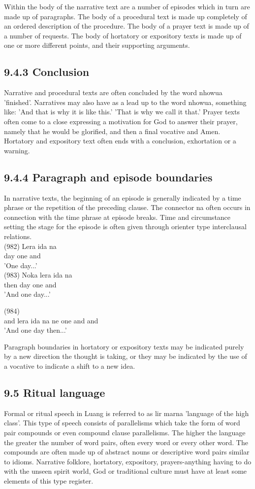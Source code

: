 \documentclass[10pt]{article}
\begin{document}
Within the body of the narrative text are a number of episodes which in turn are made up of paragraphs. The body of a procedural text is made up completely of an ordered description of the procedure. The body of a prayer text is made up of a number of requests. The body of hortatory or expository texts is made up of one or more different points, and their supporting arguments.

\subsection*{9.4.3 Conclusion}
Narrative and procedural texts are often concluded by the word nhowua 'finished'. Narratives may also have as a lead up to the word nhowua, something like: 'And that is why it is like this.' 'That is why we call it that.' Prayer texts often come to a close expressing a motivation for God to answer their prayer, namely that he would be glorified, and then a final vocative and Amen. Hortatory and expository text often ends with a conclusion, exhortation or a warning.

\subsection*{9.4.4 Paragraph and episode boundaries}
In narrative texts, the beginning of an episode is generally indicated by a time phrase or the repetition of the preceding clause. The connector na often occurs in connection with the time phrase at episode breaks. Time and circumstance setting the stage for the episode is often given through orienter type interclausal relations.\\
(982) Lera ida na\\
day one and\\
'One day...'\\
(983) Noka lera ida na\\
then day one and\\
'And one day...'

(984)\\
and lera ida na ne one and and\\
'And one day then...'

Paragraph boundaries in hortatory or expository texts may be indicated purely by a new direction the thought is taking, or they may be indicated by the use of a vocative to indicate a shift to a new idea.

\subsection*{9.5 Ritual language}
Formal or ritual speech in Luang is referred to as lir marna 'language of the high class'. This type of speech consists of parallelisms which take the form of word pair compounds or even compound clause parallelisms. The higher the language the greater the number of word pairs, often every word or every other word. The compounds are often made up of abstract nouns or descriptive word pairs similar to idioms. Narrative folklore, hortatory, expository, prayers-anything having to do with the unseen spirit world, God or traditional culture must have at least some elements of this type register.
\end{document}

